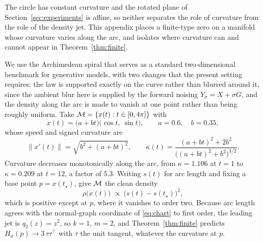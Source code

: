 The circle has constant curvature and the rotated plane of
Section~\ref{sec:experiments} is affine, so neither separates the role of
curvature from the role of the density jet.  This appendix places a finite-type
zero on a manifold whose curvature varies along the arc, and isolates where
curvature can and cannot appear in Theorem~\ref{thm:finite}.

We use the Archimedean spiral that serves as a standard two-dimensional benchmark for generative models, with two changes that the present setting requires: the law is supported exactly on the curve rather than blurred around it, since the ambient blur here is supplied by the forward noising $Y_\sigma=X+\sigma G$, and the density along the arc is made to vanish at one point rather than being roughly uniform.  Take $\mathcal{M}=\{x(t):t\in[0,4\pi]\}$ with
\begin{equation}
  x(t)=\bigl(a+bt\bigr)\bigl(\cos t,\ \sin t\bigr),
  \qquad a=0.6,\quad b=0.35 ,
  \label{eq:spiral}
\end{equation}
whose speed and signed curvature are
\begin{equation}
  \|x'(t)\|=\sqrt{b^2+(a+bt)^2},
  \qquad
  \kappa(t)=\frac{(a+bt)^2+2b^2}{\bigl((a+bt)^2+b^2\bigr)^{3/2}} .
  \label{eq:spiral-curvature}
\end{equation}
Curvature decreases monotonically along the arc, from $\kappa=1.106$ at $t=1$ to
$\kappa=0.209$ at $t=12$, a factor of $5.3$.  Writing $s(t)$ for arc length and
fixing a base point $p=x(t_\star)$, give $\mathcal{M}$ the clean density
\begin{equation}
  \rho\bigl(x(t)\bigr)\ \propto\ \bigl(s(t)-s(t_\star)\bigr)^2 ,
  \label{eq:spiral-density}
\end{equation}
which is positive except at $p$, where it vanishes to order two.  Because arc
length agrees with the normal-graph coordinate of \eqref{eq:chart} to first
order, the leading jet is $q_2(z)=z^2$, so $k=1$, $m=2$, and
Theorem~\ref{thm:finite} predicts $H_\sigma(p)\to3\,\tau\tau^\top$ with $\tau$
the unit tangent, whatever the curvature at $p$.


